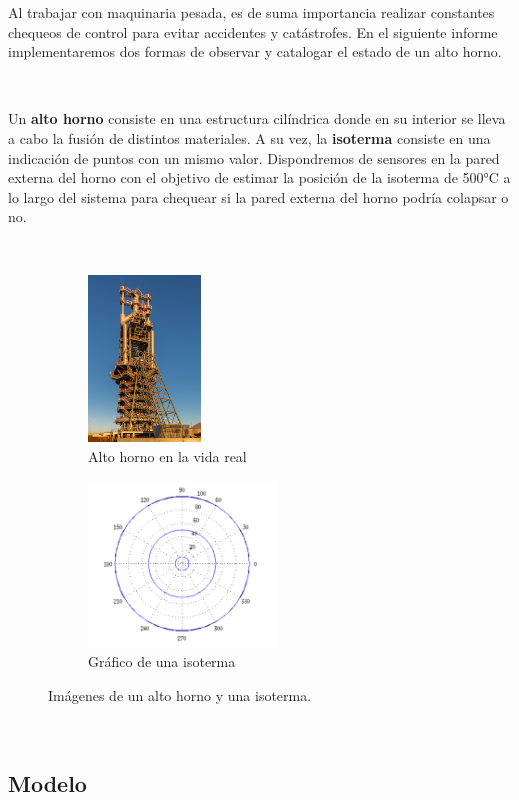 Al trabajar con maquinaria pesada, es de suma importancia  realizar  constantes chequeos de control para evitar accidentes y catástrofes. En el siguiente informe implementaremos dos formas de observar y catalogar el estado de un alto horno. 

\

Un \textbf{alto horno} consiste en una estructura cilíndrica donde en su interior se lleva a cabo la fusión de distintos materiales. A su vez, la \textbf{isoterma} consiste en una indicación de puntos con un mismo valor. Dispondremos de sensores en la pared externa del horno con el objetivo de estimar la posición de la isoterma de 500°C a lo largo del sistema para chequear si la pared externa del horno podría colapsar o no. 

\

\begin{figure}[H] 
    \centering
    \begin{subfigure}{0.4\linewidth}
        \centering
        \includegraphics[width=3cm]{img/alto_horno_real.png}
        \caption{Alto horno en la vida real}
    \end{subfigure}
    \hfill
    \centering
    \begin{subfigure}{0.4\linewidth}
        \centering
        \includegraphics[width=5cm]{img/isoterma.png}
        \caption{Gráfico de una isoterma}
    \end{subfigure}
    \label{fig:vida-real}
    \caption{Imágenes de un alto horno y una isoterma.}
\end{figure}

\

\subsection{Modelo}

